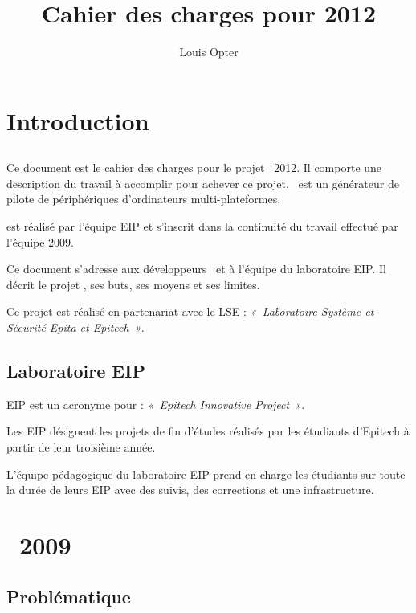 \documentclass[chapterprefix=off]{rtxreport}
\author{Louis Opter}
\title{Cahier des charges pour 2012}
\begin{document}
\maketitle

\rtxmaketitleblock

\tableofcontents

\chapter{Introduction}

\section{\rtx}


Ce document est le cahier des charges pour le projet \rtx\  2012. Il comporte
une description du travail à accomplir pour achever ce projet. \rtx\  est un
générateur de pilote de périphériques d'ordinateurs multi-plateformes.

\rtx est réalisé par l'équipe EIP  et s'inscrit dans la continuité du
travail effectué par l'équipe 2009.

Ce document s'adresse aux développeurs \rtx\  et à l'équipe du laboratoire EIP.
Il décrit le projet \rtx, ses buts, ses moyens et ses limites.

Ce projet est réalisé en partenariat avec le LSE : \emph{«~Laboratoire Système et
Sécurité Epita et Epitech~»}.

\section{Laboratoire EIP}


EIP est un acronyme pour : \emph{«~Epitech Innovative Project~»}.

Les EIP désignent les projets de fin d'études réalisés par les étudiants
d'Epitech à partir de leur troisième année.

L'équipe pédagogique du laboratoire EIP prend en charge les étudiants sur toute
la durée de leurs EIP avec des suivis, des corrections et une infrastructure.

\chapter{\rtx\ 2009}

\section{Problématique}
\end{document}
